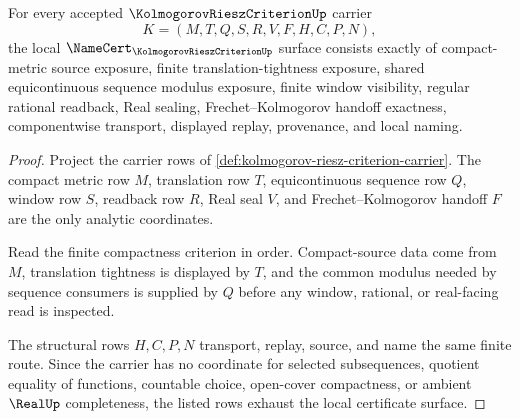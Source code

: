 \begin{theorem}
\label{thm:kolmogorov-riesz-criterion-namecert-obligations}
For every accepted $\KolmogorovRieszCriterionUp$ carrier
$$
K=(M,T,Q,S,R,V,F,H,C,P,N),
$$
the local $\NameCert_{\KolmogorovRieszCriterionUp}$ surface consists exactly of compact-metric source exposure, finite translation-tightness exposure, shared equicontinuous sequence modulus exposure, finite window visibility, regular rational readback, Real sealing, Frechet--Kolmogorov handoff exactness, componentwise transport, displayed replay, provenance, and local naming.
\end{theorem}
\begin{proof}
Project the carrier rows of \autoref{def:kolmogorov-riesz-criterion-carrier}. The compact metric row $M$, translation row $T$, equicontinuous sequence row $Q$, window row $S$, readback row $R$, Real seal $V$, and Frechet--Kolmogorov handoff $F$ are the only analytic coordinates.

Read the finite compactness criterion in order. Compact-source data come from $M$, translation tightness is displayed by $T$, and the common modulus needed by sequence consumers is supplied by $Q$ before any window, rational, or real-facing read is inspected.

The structural rows $H,C,P,N$ transport, replay, source, and name the same finite route. Since the carrier has no coordinate for selected subsequences, quotient equality of functions, countable choice, open-cover compactness, or ambient $\RealUp$ completeness, the listed rows exhaust the local certificate surface.
\end{proof}

